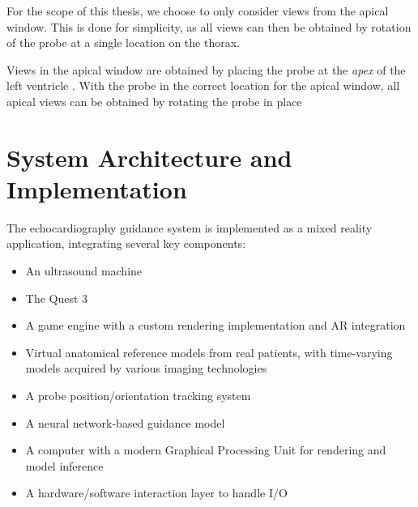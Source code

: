 \documentclass{article}
\begin{document}
For the scope of this thesis, we choose to only consider views from the apical window.
This is done for simplicity, as all views can then be obtained by rotation of the probe at a single location 
on the thorax.

Views in the apical window are obtained by placing the probe at the \textit{apex} of the left ventricle \cite{otto2018echocardiography}.
With the probe in the correct location for the apical window, all apical views can be obtained by rotating the probe in place





\section{System Architecture and Implementation}
The echocardiography guidance system is implemented as a mixed reality application, integrating several key components:
\begin{itemize}
    \item An ultrasound machine
    \item The Quest 3
    \item A game engine with a custom rendering implementation and AR integration
    \item Virtual anatomical reference models from real patients, with time-varying models acquired by various imaging technologies
    \item A probe position/orientation tracking system
    \item A neural network-based guidance model
    \item A computer with a modern Graphical Processing Unit for rendering and model inference
    \item A hardware/software interaction layer to handle I/O
\end{itemize}
\end{document}
